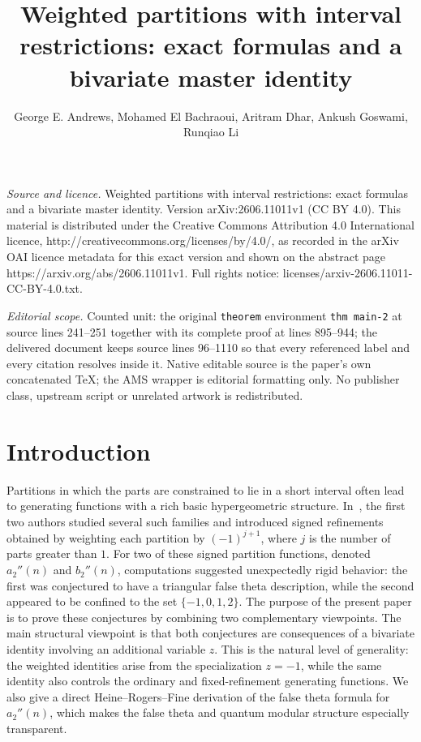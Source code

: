 \documentclass[10pt,a4paper]{amsart}
\numberwithin{equation}{section}
\begin{document}
\title[Weighted partitions with interval restrictions: exact formul]{Weighted partitions with interval restrictions: exact formulas and a bivariate master identity}
\author{George E. Andrews, Mohamed El Bachraoui, Aritram Dhar, Ankush Goswami, Runqiao Li}
\date{}
\maketitle
\noindent\emph{Source and licence.} Weighted partitions with interval restrictions: exact formulas and a bivariate master identity. Version arXiv:2606.11011v1 (CC BY 4.0). This material is distributed under the Creative Commons Attribution 4.0 International licence, http://creativecommons.org/licenses/by/4.0/, as recorded in the arXiv OAI licence metadata for this exact version and shown on the abstract page https://arxiv.org/abs/2606.11011v1. Full rights notice: licenses/arxiv-2606.11011-CC-BY-4.0.txt.\par\smallskip
\noindent\textit{Editorial scope.} Counted unit: the original \texttt{theorem} environment \texttt{thm main-2} at source lines 241--251 together with its complete proof at lines 895--944; the delivered document keeps source lines 96--1110 so that every referenced label and every citation resolves inside it. Native editable source is the paper's own concatenated TeX; the AMS wrapper is editorial formatting only. No publisher class, upstream script or unrelated artwork is redistributed.
\section{Introduction}
%
Partitions in which the parts are constrained to lie in a short interval often lead to generating functions with a rich basic hypergeometric structure. In~\cite{Andrews-Bachraoui conjectures}, the first two authors studied several such families and introduced signed refinements obtained by weighting each partition by $(-1)^{j+1}$, where $j$ is the number of parts greater than $1$. For two of these signed partition functions, denoted $a_2''(n)$ and $b_2''(n)$, computations suggested unexpectedly rigid behavior: the first was conjectured to have a triangular false theta description, while the second appeared to be confined to the set $\{-1,0,1,2\}$. The purpose of the present paper is to prove these conjectures by combining two complementary viewpoints.  The main structural viewpoint is that both conjectures are consequences of a bivariate identity involving an additional variable $z$.  This is the natural level of generality: the weighted identities arise from the specialization $z=-1$, while the same identity also controls the ordinary and fixed-refinement generating functions.  We also give a direct Heine--Rogers--Fine derivation of the false theta formula for $a_2''(n)$, which makes the false theta and quantum modular structure especially transparent.
\end{document}
